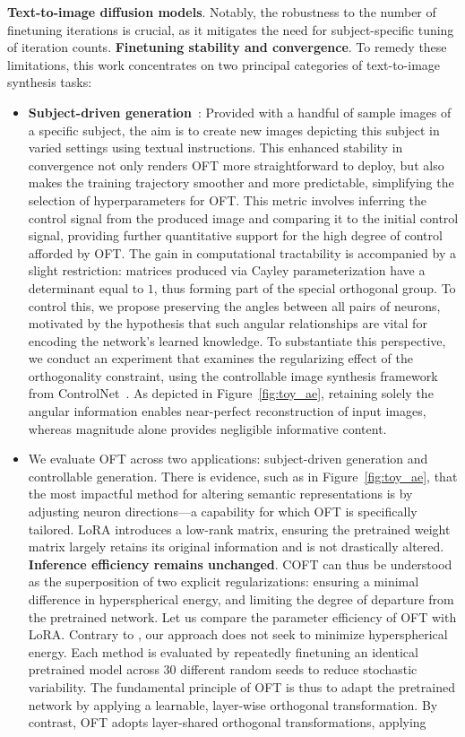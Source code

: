\textbf{Text-to-image diffusion models}. Notably, the robustness to the number of finetuning iterations is crucial, as it mitigates the need for subject-specific tuning of iteration counts. \textbf{Finetuning stability and convergence}. To remedy these limitations, this work concentrates on two principal categories of text-to-image synthesis tasks:

\begin{itemize}[leftmargin=*,nosep]

    \item \textbf{Subject-driven generation}~\cite{ruiz2023dreambooth}: Provided with a handful of sample images of a specific subject, the aim is to create new images depicting this subject in varied settings using textual instructions. This enhanced stability in convergence not only renders OFT more straightforward to deploy, but also makes the training trajectory smoother and more predictable, simplifying the selection of hyperparameters for OFT. This metric involves inferring the control signal from the produced image and comparing it to the initial control signal, providing further quantitative support for the high degree of control afforded by OFT. The gain in computational tractability is accompanied by a slight restriction: matrices produced via Cayley parameterization have a determinant equal to $1$, thus forming part of the special orthogonal group. To control this, we propose preserving the angles between all pairs of neurons, motivated by the hypothesis that such angular relationships are vital for encoding the network’s learned knowledge. To substantiate this perspective, we conduct an experiment that examines the regularizing effect of the orthogonality constraint, using the controllable image synthesis framework from ControlNet~\cite{zhang2023adding}. As depicted in Figure~\ref{fig:toy_ae}, retaining solely the angular information enables near-perfect reconstruction of input images, whereas magnitude alone provides negligible informative content. \item We evaluate OFT across two applications: subject-driven generation and controllable generation. There is evidence, such as in Figure~\ref{fig:toy_ae}, that the most impactful method for altering semantic representations is by adjusting neuron directions—a capability for which OFT is specifically tailored. LoRA introduces a low-rank matrix, ensuring the pretrained weight matrix largely retains its original information and is not drastically altered. \textbf{Inference efficiency remains unchanged}. COFT can thus be understood as the superposition of two explicit regularizations: ensuring a minimal difference in hyperspherical energy, and limiting the degree of departure from the pretrained network. Let us compare the parameter efficiency of OFT with LoRA. Contrary to \cite{liu2021orthogonal}, our approach does not seek to minimize hyperspherical energy. Each method is evaluated by repeatedly finetuning an identical pretrained model across 30 different random seeds to reduce stochastic variability. The fundamental principle of OFT is thus to adapt the pretrained network by applying a learnable, layer-wise orthogonal transformation. By contrast, OFT adopts layer-shared orthogonal transformations, applying 
\end{itemize}
